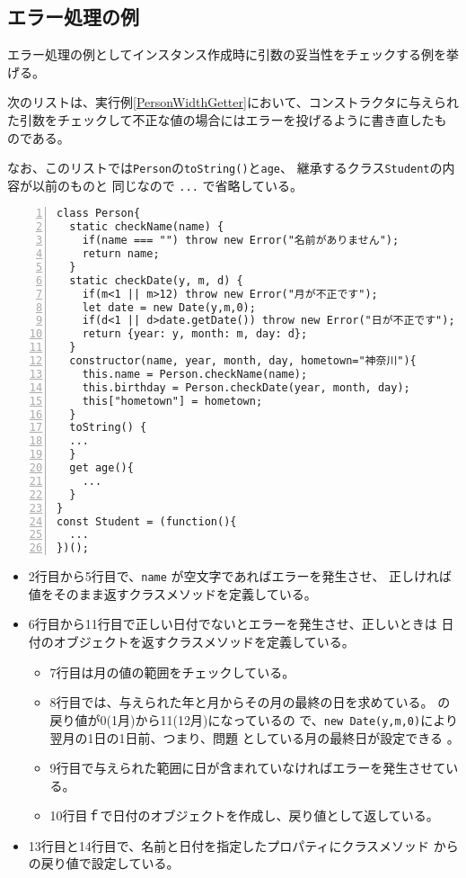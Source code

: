 \subsection{エラー処理の例}
エラー処理の例としてインスタンス作成時に引数の妥当性をチェックする例を挙げる。
 \begin{Exec}\upshape\label{throwError}
	次のリストは、実行例\ref{PersonWidthGetter}において、コンストラクタに与えられ
	た引数をチェックして不正な値の場合にはエラーを投げるように書き直したも
	のである。

	なお、このリストでは\texttt{Person}の\texttt{toString()}と\texttt{age}、
	継承するクラス\texttt{Student}の内容が以前のものと
	同じなので \texttt{...} で省略している。
 \end{Exec}
\begin{Verbatim}[numbers=left]
class Person{
  static checkName(name) {
    if(name === "") throw new Error("名前がありません");
    return name;
  }
  static checkDate(y, m, d) {
    if(m<1 || m>12) throw new Error("月が不正です");
    let date = new Date(y,m,0);
    if(d<1 || d>date.getDate()) throw new Error("日が不正です");
    return {year: y, month: m, day: d};
  }
  constructor(name, year, month, day, hometown="神奈川"){
    this.name = Person.checkName(name);
    this.birthday = Person.checkDate(year, month, day);
    this["hometown"] = hometown;
  }
  toString() {
  ...
  }
  get age(){
    ...
  }
}
const Student = (function(){
  ...
})();
\end{Verbatim}
\begin{itemize}
 \item 2行目から5行目で、\texttt{name} が空文字であればエラーを発生させ、
       正しければ値をそのまま返すクラスメソッドを定義している。
 \item 6行目から11行目で正しい日付でないとエラーを発生させ、正しいときは
       日付のオブジェクトを返すクラスメソッドを定義している。
       \begin{itemize}
        \item 7行目は月の値の範囲をチェックしている。
 \item 8行目では、与えられた年と月からその月の最終の日を求めている。
			 の戻り値が0(1月)から11(12月)になっているの
			 で、\texttt{new Date(y,m,0)}により翌月の1日の1日前、つまり、問題
			 としている月の最終日が設定できる
       。
 \item 9行目で与えられた範囲に日が含まれていなければエラーを発生させてい
			 る。
        \item 10行目ｆで日付のオブジェクトを作成し、戻り値として返している。
       \end{itemize}
 \item 13行目と14行目で、名前と日付を指定したプロパティにクラスメソッド
       からの戻り値で設定している。
\end{itemize}
